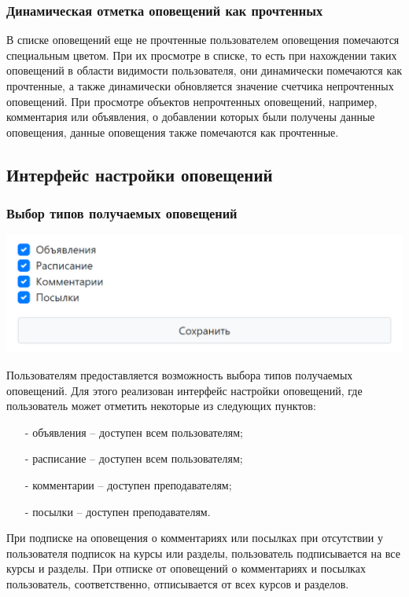 \documentclass[12pt, a4paper, oneside]{article}
\begin{document}
\subsubsection{Динамическая отметка оповещений как прочтенных}
В списке оповещений еще не прочтенные пользователем оповещения помечаются специальным цветом. При их просмотре в списке, то есть при нахождении таких оповещений в области видимости пользователя, они динамически помечаются как прочтенные, а также динамически обновляется значение счетчика непрочтенных оповещений. При просмотре объектов непрочтенных оповещений, например, комментария или объявления, о добавлении которых были получены данные оповещения, данные оповещения также помечаются как прочтенные.
\subsection{Интерфейс настройки оповещений}
\subsubsection{Выбор типов получаемых оповещений}
\begin{center}
    \includegraphics[scale=0.4]{activity-settings}
\end{center}

Пользователям предоставляется возможность выбора типов получаемых оповещений. Для этого реализован интерфейс настройки оповещений, где пользователь может отметить некоторые из следующих пунктов:
\begin{itemize}
    \item [-] объявления – доступен всем пользователям;
    \item [-] расписание – доступен всем пользователям;
    \item [-] комментарии – доступен преподавателям;
    \item [-] посылки – доступен преподавателям.
\end{itemize}

При подписке на оповещения о комментариях или посылках при отсутствии у пользователя подписок на курсы или разделы, пользователь подписывается на все курсы и разделы. При отписке от оповещений о комментариях и посылках пользователь, соответственно, отписывается от всех курсов и разделов.
\end{document}
